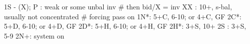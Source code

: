 1S - (X);
P  : weak or some unbal inv  # then bid/X = inv
XX : 10+, s-bal, usually not concentrated  # forcing pass on
1N*: 5+C, 6-10; or 4+C, GF
2C*: 5+D, 6-10; or 4+D, GF
2D*: 5+H, 6-10; or 4+H, GF
2H*: 3+S, 10+
2S : 3+S, 5-9
2N+: system on